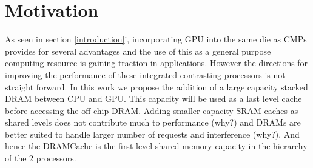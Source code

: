 \section{Motivation} \label{motivation}
As seen in section \ref{introduction}i, incorporating GPU into the same die as CMPs provides for several advantages and the use of this as a general purpose computing resource is gaining traction in applications. However the directions for improving the performance of these integrated contrasting processors is not straight forward. In this work we propose the addition of a large capacity stacked DRAM between CPU and GPU. This capacity will be used as a last level cache before accessing the off-chip DRAM. Adding smaller capacity SRAM caches as shared levels does not contribute much to performance (why?) and DRAMs are better suited to handle larger number of requests and interference (why?). And hence the DRAMCache is the first level shared memory capacity in the hierarchy of the 2 processors.

